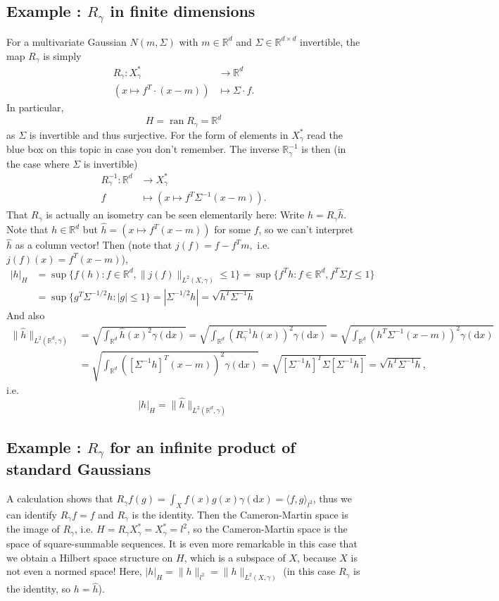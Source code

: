 \documentclass{scrartcl}
\theoremstyle{definition}
\theoremstyle{remark}
\newcommand{\de}{\mathrm d}
\newcommand{\R}{\mathbb R}
\newcommand*\circled[1]{\tikz[baseline=(char.base)]{
            \node[shape=circle,draw,inner sep=2pt] (char) {#1};}}
\DeclareRobustCommand{\myboxtwo}[2][blue!20]{%
\begin{tcolorbox}[   %
        breakable,
        left=0pt,
        right=0pt,
        top=0pt,
        bottom=0pt,
        colback=#1,
        colframe=#1,
        width=\dimexpr\textwidth\relax, 
        enlarge left by=0mm,
        boxsep=5pt,
        arc=10pt,outer arc=10pt,
        ]
        #2
\end{tcolorbox}
}
\begin{document}
\myboxtwo[blue!20]{
\subsection*{Example \circled{1}: $R_\gamma$ in finite dimensions}
For a multivariate Gaussian $N(m, \Sigma)$ with $m\in\R^d$ and $\Sigma \in \R^{d\times d}$ invertible, the map $R_\gamma$ is simply 
\begin{align*}
R_\gamma : X_\gamma^* &\to \R^d\\
(x\mapsto f^T \cdot (x-m)) &\mapsto \Sigma \cdot f.
\end{align*}
In particular,
\[ H = \operatorname{ran} R_\gamma = \R^d \]
as $\Sigma$ is invertible and thus surjective.
For the form of elements in $X_\gamma^*$ read the blue box on this topic in case you don't remember. The inverse $\R_\gamma^{-1}$ is then (in the case where $\Sigma$ is invertible)
\begin{align*}
R_\gamma^{-1}: \R^d &\to X_\gamma^*\\
f &\mapsto (x\mapsto f^T \Sigma^{-1}(x-m)).
\end{align*}
That $R_\gamma$ is actually an isometry can be seen elementarily here: Write $h = R_\gamma \hat h$. Note that $h \in \R^d$ but $\hat h =(x\mapsto f^T(x-m))$ for some $f$, so we can't interpret $\hat h$ as a column vector! Then (note that $j(f) = f - f^Tm,$ i.e. $j(f)(x) = f^T(x-m)$),
\begin{align*}
|h|_H &= \sup\{f(h): f\in \R^d, \|j(f)\|_{L^2(X, \gamma)} \leq 1\} = \sup\{f^Th: f\in \R^d, f^T\Sigma f \leq 1\}\\
&= \sup\{g^T\Sigma^{-1/2}h: |g| \leq 1\} = |\Sigma^{-1/2}h| = \sqrt{h^T\Sigma^{-1}h}
\end{align*}
And also
\begin{align*}
\|\hat h\|_{L^2(\R^d, \gamma)} &= \sqrt{\int_{\R^d}\hat h(x)^2 \gamma(\de x)} = \sqrt{\int_{\R^d}(R_\gamma^{-1} h(x))^2 \gamma(\de x)} = \sqrt{\int_{\R^d}(h^T\Sigma^{-1}(x-m))^2 \gamma(\de x)}\\
&=\sqrt{\int_{\R^d}([\Sigma^{-1}h]^T(x-m))^2 \gamma(\de x)} = \sqrt{[\Sigma^{-1}h]^T\Sigma [\Sigma^{-1}h]} = \sqrt{h^T\Sigma^{-1}h},
\end{align*}
i.e. \[|h|_H = \|\hat h\|_{L^2(\R^d, \gamma)}\]
}

\myboxtwo{
\subsection*{Example \circled{2}: $R_\gamma$ for an infinite product of standard Gaussians}
A calculation shows that $R_\gamma f(g) = \int_X f(x)g(x)\gamma(\de x) = \langle f, g\rangle_{l^2}$, thus we can identify $R_\gamma f = f$ and $R_\gamma$ is the identity. Then the Cameron-Martin space is the image of $R_\gamma$, i.e. $H = R_\gamma X_\gamma^* = X_\gamma^* = l^2$, so the Cameron-Martin space is the space of square-summable sequences. It is even more remarkable in this case that we obtain a Hilbert space structure on $H$, which is a subspace of $X$, because $X$ is not even a normed space! Here, $|h|_H = \|h\|_{l^2} = \|h\|_{L^2(X,\gamma)}$ (in this case $R_\gamma$ is the identity, so $h = \hat h$).
}
\end{document}
